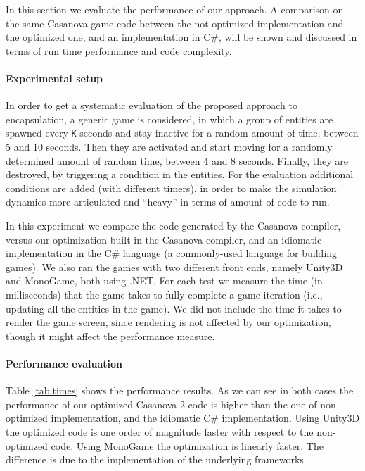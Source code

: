 In this section we evaluate the performance of our approach. A comparison on the same Casanova game code between the not optimized implementation and the optimized one, and an implementation in C\#, will be shown and discussed in terms of run time performance and code complexity.

\paragraph*{Experimental setup} In order to get a systematic evaluation of the proposed approach to encapsulation, a generic game is considered, in which a group of entities are spawned every \texttt{K} seconds and stay inactive for a random amount of time, between 5 and 10 seconds. Then they are activated and start moving for a randomly determined amount of random time, between 4 and 8 seconds. Finally, they are destroyed, by triggering a condition in the entities. For the evaluation additional conditions are added (with different timers), in order to make the simulation dynamics more articulated and ``heavy'' in terms of amount of code to run.


In this experiment we compare the code generated by the Casanova compiler, versus our optimization built in the Casanova compiler, and an idiomatic implementation in the C\# language (a commonly-used language for building games). We also ran the games with two different front ends, namely Unity3D and MonoGame, both using .NET.
For each test we measure the time (in milliseconds) that the game takes to fully complete a game iteration (i.e., updating all the entities in the game). We did not include the time it takes to render the game screen, since rendering is not affected by our optimization, though it might affect the performance measure.
\paragraph*{Performance evaluation} Table \ref{tab:times} shows the performance results. As we can see in both cases the performance of our optimized Casanova 2 code is higher than the one of non-optimized implementation, and the idiomatic C\# implementation. Using Unity3D the optimized code is one order of magnitude faster with respect to the non-optimized code. Using MonoGame the optimization is linearly faster. The difference is due to the implementation of the underlying frameworks.

